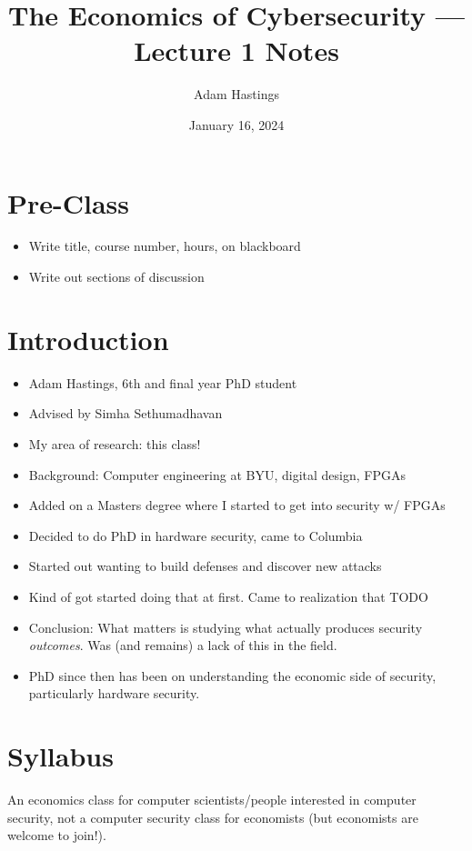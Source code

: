 \documentclass[11pt]{article}
\title{The Economics of Cybersecurity --- Lecture 1 Notes}
\date{January 16, 2024}
\author{Adam Hastings}
\begin{document}
\maketitle

\section*{Pre-Class}
\begin{itemize}
    \item Write title, course number, hours, on blackboard
    \item Write out sections of discussion
\end{itemize}

\section{Introduction}
\begin{itemize}
    \item Adam Hastings, 6th and final year PhD student
    \item Advised by Simha Sethumadhavan
    \item My area of research: this class! 
    \item Background: Computer engineering at BYU, digital design, FPGAs
    \item Added on a Masters degree where I started to get into security w/ FPGAs
    \item Decided to do PhD in hardware security, came to Columbia
    \item Started out wanting to build defenses and discover new attacks 
    \item Kind of got started doing that at first. Came to realization that TODO
    \item Conclusion: What matters is studying what actually produces security {\it outcomes}. Was (and remains) a lack of this in the field.
    \item PhD since then has been on understanding the economic side of security, particularly hardware security.
\end{itemize}


\section{Syllabus}

An economics class for computer scientists/people interested in computer security, not a computer security class for economists
(but economists are welcome to join!).
\end{document}

